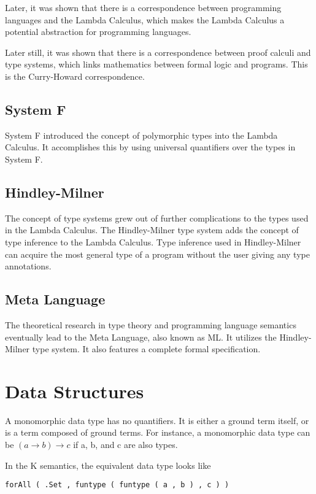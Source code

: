 Later, it was shown that there is a correspondence between programming languages and the Lambda Calculus, which makes the Lambda Calculus a potential abstraction for programming languages.

Later still, it was shown that there is a correspondence between proof calculi and type systems, which links mathematics between formal logic and programs. This is the Curry-Howard correspondence.

\subsection{System F}
System F \cite{Reynolds2018} introduced the concept of polymorphic types into the Lambda Calculus. It accomplishes this by using universal quantifiers over the types in System F.

\subsection{Hindley-Milner}
The concept of type systems grew out of further complications to the types used in the Lambda Calculus.
The Hindley-Milner type system adds the concept of type inference to the Lambda Calculus. Type inference used in Hindley-Milner can acquire the most general type of a program without the user giving any type annotations.

\subsection{Meta Language}
The theoretical research in type theory and programming language semantics eventually lead to the Meta Language, also known as ML. It utilizes the Hindley-Milner type system. It also features a complete formal specification.

\section{Data Structures}

A monomorphic data type has no quantifiers. It is either a ground term itself, or is a term composed of ground terms. For instance, a monomorphic data type can be $(a \rightarrow b) \rightarrow c$ if a, b, and c are also types.

In the K semantics, the equivalent data type looks like
\begin{lstlisting}
forAll ( .Set , funtype ( funtype ( a , b ) , c ) )
\end{lstlisting}

